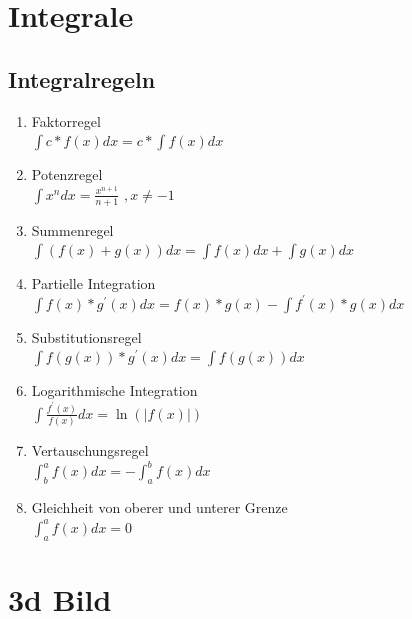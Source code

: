 \documentclass[12pt,a4paper]{article}
\begin{document}
\section{Integrale}

	\subsection{Integralregeln}
		\begin{enumerate}
			\item Faktorregel \\
				$\int {c*f(x)dx} = c * \int {f(x)dx}$
			\item Potenzregel\\
				$\int{x^n}dx = \frac{x^{n+1}}{n+1}$   $, x \ne -1$
			\item Summenregel \\
				$\int {(f(x) + g(x))dx} = \int{f(x)dx} + \int{g(x)dx}$ 
			\item Partielle Integration\\
				$\int{f(x)*g^{'}(x)dx} = f(x)*g(x) - \int{f^{'}(x)*g(x)dx}$
			\item Substitutionsregel \\ 
				$\int{f(g(x)) * g^{'}(x)dx} =\int{f(g(x))dx}$
			\item Logarithmische Integration\\
				$\int{\frac{f^{'}(x)}{f(x)}dx} = \ln{(|f(x)|)} $
			\item Vertauschungsregel \\
				$\int^a_b{f(x)dx} = - \int^b_a{f(x)dx}$
			\item Gleichheit von oberer und unterer Grenze \\
				$\int^a_a{f(x)dx} = 0$
		\end{enumerate}


\section{3d Bild} %
	
\end{document}
